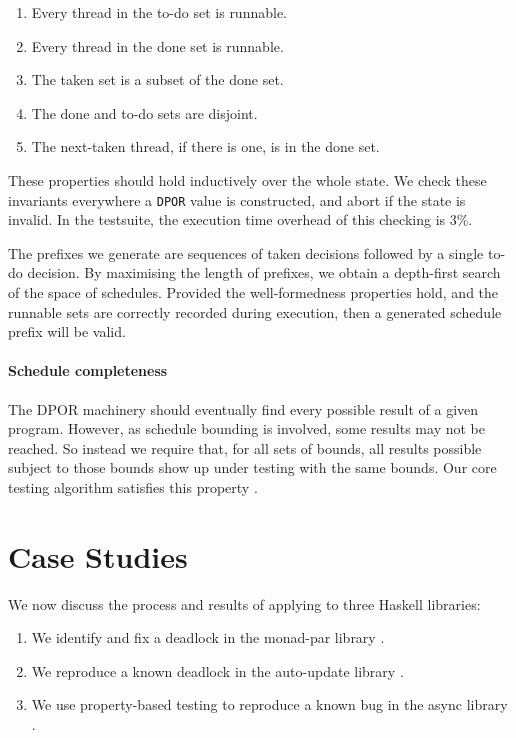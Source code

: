 \begin{enumerate}
\item Every thread in the to-do set is runnable.
\item Every thread in the done set is runnable.
\item The taken set is a subset of the done set.
\item The done and to-do sets are disjoint.
\item The next-taken thread, if there is one, is in the done set.
\end{enumerate}

These properties should hold inductively over the whole state.  We
check these invariants everywhere a \verb|DPOR| value is constructed,
and abort if the state is invalid.  In the \dejafu{} testsuite, the
execution time overhead of this checking is 3\%.

The prefixes we generate are sequences of taken decisions followed by
a single to-do decision.  By maximising the length of prefixes, we
obtain a depth-first search of the space of schedules.  Provided the
well-formedness properties hold, and the runnable sets are correctly
recorded during execution, then a generated schedule prefix will be
valid.

\paragraph{Schedule completeness}
The DPOR machinery should eventually find every possible result of a
given program.  However, as schedule bounding is involved, some
results may not be reached.  So instead we require that, for all sets
of bounds, all results possible subject to those bounds show up under
testing with the same bounds.  Our core testing algorithm satisfies
this property \parencite{coons2013}.

\section{Case Studies}
\label{sec:dejafu-casestudies}

We now discuss the process and results of applying \dejafu{} to three
Haskell libraries:

\begin{enumerate}
\item We identify and fix a deadlock in the monad-par
  library \parencite{monad_par,marlow2011}.
\item We reproduce a known deadlock in the auto-update
  library \parencite{auto_update}.
\item We use property-based testing to reproduce a known bug in the
  async library \parencite{async}.
\end{enumerate}

